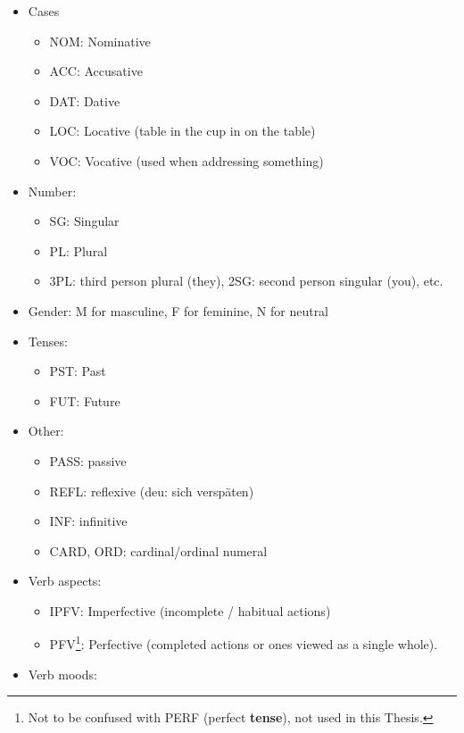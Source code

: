 \begin{itemize}
\tightlist
\item
  Cases

  \begin{itemize}
  \tightlist
  \item
    NOM: Nominative
  \item
    ACC: Accusative
  \item
    DAT: Dative
  \item
    LOC: Locative (\textquotesingle table\textquotesingle{} in
    \textquotesingle the cup in on the table\textquotesingle)
  \item
    VOC: Vocative (used when addressing something)
  \end{itemize}
\item
  Number:

  \begin{itemize}
  \tightlist
  \item
    SG: Singular
  \item
    PL: Plural
  \item
    3PL: third person plural (they), 2SG: second person singular (you),
    etc.
  \end{itemize}
\item
  Gender: M for masculine, F for feminine, N for neutral
\item
  Tenses:

  \begin{itemize}
  \tightlist
  \item
    PST: Past
  \item
    FUT: Future
  \end{itemize}
\item
  Other:

  \begin{itemize}
  \tightlist
  \item
    PASS: passive
  \item
    REFL: reflexive (deu: \textquotesingle sich
    verspäten\textquotesingle)
  \item
    INF: infinitive
  \item
    CARD, ORD: cardinal/ordinal numeral
  \end{itemize}
\item
  Verb aspects:

  \begin{itemize}
  \tightlist
  \item
    IPFV: Imperfective (incomplete / habitual actions)
  \item
    PFV\footnote{Not to be confused with PERF (perfect \textbf{tense}),
      not used in this Thesis.}: Perfective (completed actions or ones
    viewed as a single whole).
  \end{itemize}
\item
  Verb moods:


\end{itemize}
